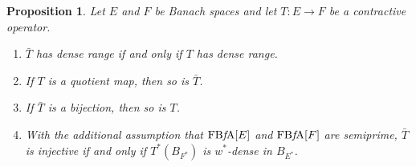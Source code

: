 \documentclass{memo-l}
\newtheorem{prop}[theorem]{Proposition}
\theoremstyle{definition}
\theoremstyle{remark}
\numberwithin{section}{chapter}
\numberwithin{equation}{chapter}
\newcommand{\FBFA}[1]{\operatorname{FB{\it f}\!A}[#1]}
\begin{document}
\begin{prop}\label{prop:extension_properties}
    Let $E$ and $F$ be Banach spaces and let $T\colon E\to F$ be a contractive operator.
    \begin{enumerate}
        \item $\bar{T}$ has dense range if and only if $T$ has dense
            range.
        \item If $T$ is a quotient map, then so is $\bar{T}$.
        \item If $\bar{T}$ is a bijection, then so is $T$.
        \item With the additional assumption that $\FBFA E$ and $\FBFA
            F$ are semiprime, $\bar{T}$ is injective if and only if
            $T^{*}(B_{F^{*}})$ is $w^{*}$-dense in $B_{E^{*}}$.
    \end{enumerate}
\end{prop}
\end{document}
